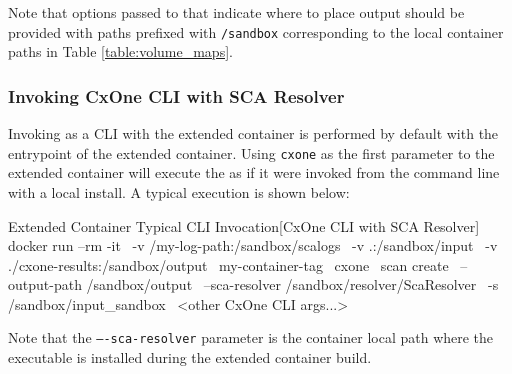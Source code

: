 Note that options passed to \scaresolver that indicate where to place output should be provided 
with paths prefixed with \texttt{/sandbox} corresponding to the local container paths in 
Table \ref{table:volume_maps}.

\subsubsection{Invoking CxOne CLI with SCA Resolver}

Invoking \scaresolver as a CLI with the extended container is performed by default with the entrypoint
of the extended container.  Using \texttt{cxone} as the first parameter to the extended container will
execute the \cxonecli as if it were invoked from the command line with a local install. A typical
execution is shown below:\\


\begin{code}{Extended Container Typical CLI Invocation}{[CxOne CLI with SCA Resolver]}{}
    docker run --rm -it \
        -v /my-log-path:/sandbox/scalogs \
        -v .:/sandbox/input \
        -v ./cxone-results:/sandbox/output \
        my-container-tag \
        cxone \
        scan create \
        --output-path /sandbox/output \
        --sca-resolver /sandbox/resolver/ScaResolver \
        -s /sandbox/input_sandbox \
        <other CxOne CLI args...>
\end{code}

Note that the \texttt{----sca-resolver} parameter is the container local path where the \scaresolver
executable is installed during the extended container build.
